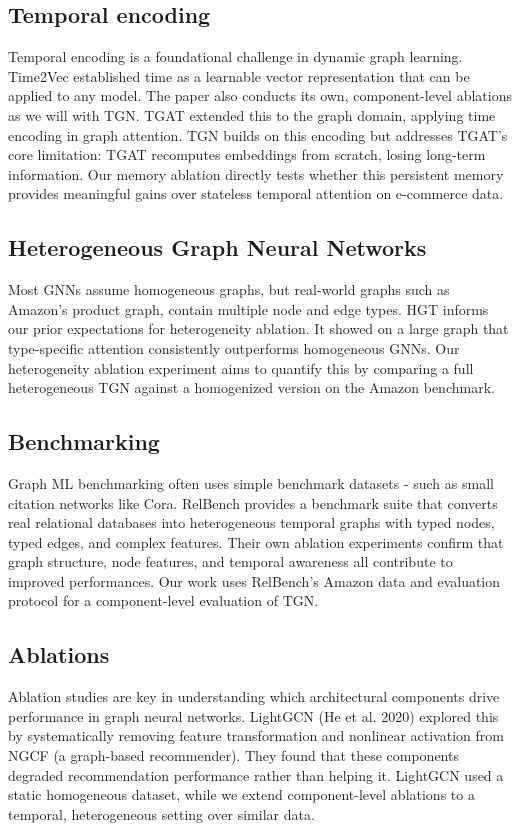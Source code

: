 \documentclass[sigconf]{acmart}
\begin{document}
\subsection{Temporal encoding}

Temporal encoding is a foundational challenge in dynamic graph learning. Time2Vec \cite{kazemi2019time2vec} established time as a learnable vector representation that can be applied to any model. The paper also conducts its own, component-level ablations as we will with TGN. TGAT extended this to the graph domain, applying time encoding in graph attention. TGN builds on this encoding but addresses TGAT's core limitation: TGAT recomputes embeddings from scratch, losing long-term information. Our memory ablation directly tests whether this persistent memory provides meaningful gains over stateless temporal attention on e-commerce data.

\subsection{Heterogeneous Graph Neural Networks}
		
Most GNNs assume homogeneous graphs, but real-world graphs such as Amazon's product graph, contain multiple node and edge types. HGT \cite{hu2020hgt} informs our prior expectations for heterogeneity ablation. It showed on a large graph that type-specific attention consistently outperforms homogeneous GNNs. Our heterogeneity ablation experiment aims to quantify this by comparing a full heterogeneous TGN against a homogenized version on the Amazon benchmark.

\subsection{Benchmarking}
	
Graph ML benchmarking often uses simple benchmark datasets - such as small citation networks like Cora. RelBench \cite{robinson2024relbench}  provides a benchmark suite that converts real relational databases into heterogeneous temporal graphs with typed nodes, typed edges, and complex features. Their own ablation experiments confirm that graph structure, node features, and temporal awareness all contribute to improved performances. Our work uses RelBench's Amazon data and evaluation protocol for a component-level evaluation of TGN.

\subsection{Ablations}
Ablation studies are key in understanding which architectural components drive performance in graph neural networks. LightGCN (He et al. 2020) explored this by systematically removing feature transformation and nonlinear activation from NGCF (a graph-based recommender). They found that these components degraded recommendation performance rather than helping it. LightGCN used a static homogeneous dataset, while we extend component-level ablations to a temporal, heterogeneous setting over similar data. 
\end{document}
